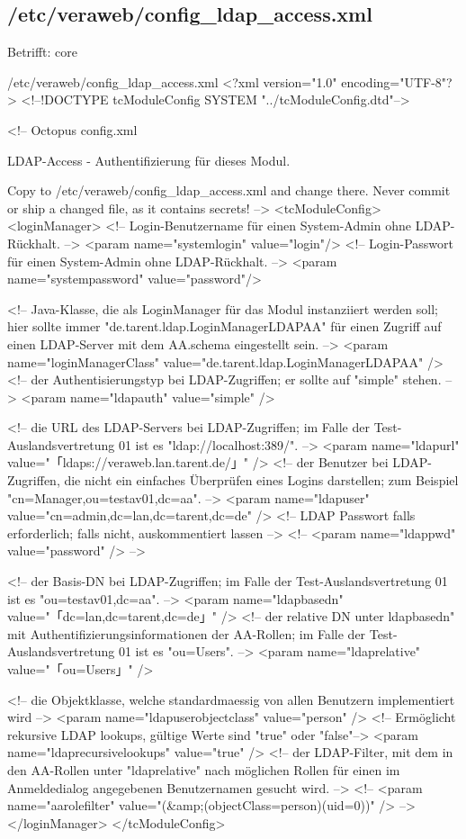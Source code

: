 \documentclass{tarentanleitung}
\begin{document}
\subsection{/etc/veraweb/config\_ldap\_access.xml}\label{subsec:refcfg-vw-cfgldap}

Betrifft: core

\begin{lstdump}[basicstyle=\ttfamily\footnotesize]{/etc/veraweb/config_ldap_access.xml}
<?xml version="1.0" encoding="UTF-8"?>
<!--!DOCTYPE tcModuleConfig SYSTEM "../tcModuleConfig.dtd"-->

<!--
	Octopus config.xml

	LDAP-Access - Authentifizierung für dieses Modul.

	Copy to /etc/veraweb/config_ldap_access.xml and change there.
	Never commit or ship a changed file, as it contains secrets!
-->
<tcModuleConfig>
	<loginManager>
		<!-- Login-Benutzername für einen System-Admin ohne LDAP-Rückhalt. -->
		<param name="systemlogin" value="login"/>
		<!-- Login-Passwort für einen System-Admin ohne LDAP-Rückhalt. -->
		<param name="systempassword" value="password"/>

		<!-- Java-Klasse, die als LoginManager für das Modul instanziiert werden soll; hier sollte immer "de.tarent.ldap.LoginManagerLDAPAA" für einen Zugriff auf einen LDAP-Server mit dem AA.schema eingestellt sein. -->
		<param name="loginManagerClass" value="de.tarent.ldap.LoginManagerLDAPAA" />
		<!-- der Authentisierungstyp bei LDAP-Zugriffen; er sollte auf "simple" stehen. -->
		<param name="ldapauth" value="simple" />

		<!-- die URL des LDAP-Servers bei LDAP-Zugriffen; im Falle der Test-Auslandsvertretung 01 ist es "ldap://localhost:389/". -->
		<param name="ldapurl" value="「ldaps://veraweb.lan.tarent.de/」" />
		<!-- der Benutzer bei LDAP-Zugriffen, die nicht ein einfaches Überprüfen eines Logins darstellen; zum Beispiel "cn=Manager,ou=testav01,dc=aa". -->
		<param name="ldapuser" value="cn=admin,dc=lan,dc=tarent,dc=de" />
		<!-- LDAP Passwort falls erforderlich; falls nicht, auskommentiert lassen -->
		<!-- <param name="ldappwd" value="password" /> -->

		<!-- der Basis-DN bei LDAP-Zugriffen; im Falle der Test-Auslandsvertretung 01 ist es "ou=testav01,dc=aa". -->
		<param name="ldapbasedn" value="「dc=lan,dc=tarent,dc=de」" />
		<!-- der relative DN unter ldapbasedn" mit Authentifizierungsinformationen der AA-Rollen; im Falle der Test-Auslandsvertretung 01 ist es "ou=Users". -->
		<param name="ldaprelative" value="「ou=Users」" />

		<!-- die Objektklasse, welche standardmaessig von allen Benutzern implementiert wird -->
		<param name="ldapuserobjectclass" value="person" />
		<!-- Ermöglicht rekursive LDAP lookups, gültige Werte sind "true" oder "false"-->
		<param name="ldaprecursivelookups" value="true" />
		<!-- der LDAP-Filter, mit dem in den AA-Rollen unter "ldaprelative" nach möglichen Rollen für einen im Anmeldedialog angegebenen Benutzernamen gesucht wird. -->
		<!-- <param name="aarolefilter" value="(&amp;(objectClass=person)(uid={0}))" /> -->
	</loginManager>
</tcModuleConfig>
\end{lstdump}
\end{document}
